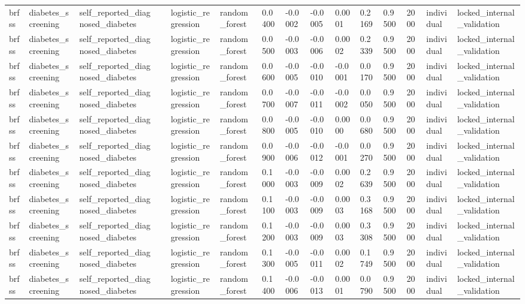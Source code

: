 \begin{tabular}{lllllllllllllll}
brfss & diabetes\_screening & self\_reported\_diagnosed\_diabetes &  & logistic\_regression & random\_forest & 0.0400 & -0.0002 & -0.0005 & 0.0001 & 0.2169 & 0.9500 & 2000 & individual & locked\_internal\_validation \\
brfss & diabetes\_screening & self\_reported\_diagnosed\_diabetes &  & logistic\_regression & random\_forest & 0.0500 & -0.0003 & -0.0006 & 0.0002 & 0.2339 & 0.9500 & 2000 & individual & locked\_internal\_validation \\
brfss & diabetes\_screening & self\_reported\_diagnosed\_diabetes &  & logistic\_regression & random\_forest & 0.0600 & -0.0005 & -0.0010 & -0.0001 & 0.0170 & 0.9500 & 2000 & individual & locked\_internal\_validation \\
brfss & diabetes\_screening & self\_reported\_diagnosed\_diabetes &  & logistic\_regression & random\_forest & 0.0700 & -0.0007 & -0.0011 & -0.0002 & 0.0050 & 0.9500 & 2000 & individual & locked\_internal\_validation \\
brfss & diabetes\_screening & self\_reported\_diagnosed\_diabetes &  & logistic\_regression & random\_forest & 0.0800 & -0.0005 & -0.0010 & 0.0000 & 0.0680 & 0.9500 & 2000 & individual & locked\_internal\_validation \\
brfss & diabetes\_screening & self\_reported\_diagnosed\_diabetes &  & logistic\_regression & random\_forest & 0.0900 & -0.0006 & -0.0012 & -0.0001 & 0.0270 & 0.9500 & 2000 & individual & locked\_internal\_validation \\
brfss & diabetes\_screening & self\_reported\_diagnosed\_diabetes &  & logistic\_regression & random\_forest & 0.1000 & -0.0003 & -0.0009 & 0.0002 & 0.2639 & 0.9500 & 2000 & individual & locked\_internal\_validation \\
brfss & diabetes\_screening & self\_reported\_diagnosed\_diabetes &  & logistic\_regression & random\_forest & 0.1100 & -0.0003 & -0.0009 & 0.0003 & 0.3168 & 0.9500 & 2000 & individual & locked\_internal\_validation \\
brfss & diabetes\_screening & self\_reported\_diagnosed\_diabetes &  & logistic\_regression & random\_forest & 0.1200 & -0.0003 & -0.0009 & 0.0003 & 0.3308 & 0.9500 & 2000 & individual & locked\_internal\_validation \\
brfss & diabetes\_screening & self\_reported\_diagnosed\_diabetes &  & logistic\_regression & random\_forest & 0.1300 & -0.0005 & -0.0011 & 0.0002 & 0.1749 & 0.9500 & 2000 & individual & locked\_internal\_validation \\
brfss & diabetes\_screening & self\_reported\_diagnosed\_diabetes &  & logistic\_regression & random\_forest & 0.1400 & -0.0006 & -0.0013 & 0.0001 & 0.0790 & 0.9500 & 2000 & individual & locked\_internal\_validation \\

\end{tabular}
